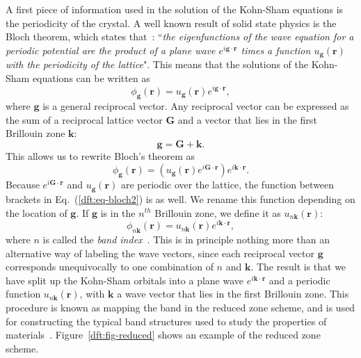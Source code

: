 \begin{refsection}
A first piece of information used in the solution of the Kohn-Sham equations 
is the periodicity of the crystal. A well known result of solid state physics 
is the Bloch theorem, which states that~\cite{Kittel2004}: ``\textit{the 
eigenfunctions of the wave equation for a periodic potential are the product 
of a plane wave $e^{i\mathbf{g}\cdot \mathbf{r}}$ times a function 
$u_{\mathbf{g}}(\mathbf{r})$ with the periodicity of the lattice}". This means 
that the solutions of the Kohn-Sham equations can be written as 
\begin{equation} 
\phi_{\mathbf{g}}(\mathbf{r}) = u_{\mathbf{g}}(\mathbf{r}) e^{i\mathbf{g}\cdot 
\mathbf{r}}, 
\end{equation} 
where $\mathbf{g}$ is a general reciprocal vector. Any reciprocal vector can 
be expressed as the sum of a reciprocal lattice vector $\mathbf{G}$ and a 
vector that lies in the first Brillouin zone $\mathbf{k}$:  
\begin{equation} 
\mathbf{g} = \mathbf{G} + \mathbf{k}. 
\end{equation} 
This allows us to rewrite Bloch's theorem as 
\begin{equation}\label{dft:eq-bloch2} 
\phi_{\mathbf{g}}(\mathbf{r}) = \left( u_{\mathbf{g}}(\mathbf{r}) 
e^{i\mathbf{G}\cdot \mathbf{r}}\right)e^{i\mathbf{k}\cdot \mathbf{r}}. 
\end{equation} 
Because $e^{i\mathbf{G}\cdot\mathbf{r}}$ and $u_{\mathbf{g}}(\mathbf{r})$ are 
periodic over the lattice, the function between brackets in 
Eq.~(\ref{dft:eq-bloch2}) is as well. We rename this function depending on the 
location of $\mathbf{g}$. If $\mathbf{g}$ is in the $n^{th}$ Brillouin zone, 
we define it as $u_{n\mathbf{k}}(\mathbf{r})$: 
\begin{equation}\label{dft:eq-bloch} 
\phi_{n\mathbf{k}}(\mathbf{r}) = u_{n\mathbf{k}}(\mathbf{r}) 
e^{i\mathbf{k}\cdot \mathbf{r}}, 
\end{equation} 
where $n$ is called the \textit{band index}~\cite{Cottenier2013}. This is in 
principle nothing more than an alternative way of labeling the wave vectors, 
since each reciprocal vector $\mathbf{g}$ corresponds unequivocally to one 
combination of $n$ and $\mathbf{k}$. The result is that we have split up the 
Kohn-Sham orbitals into a plane wave $e^{i\mathbf{k}\cdot \mathbf{r}}$ and a 
periodic function $u_{n\mathbf{k}}(\mathbf{r})$, with $\mathbf{k}$ a wave 
vector that lies in the first Brillouin zone. This procedure is known as 
mapping the band in the reduced zone scheme, and is used for constructing the 
typical band structures used to study the properties of 
materials~\cite{Kittel2004}. Figure~\ref{dft:fig-reduced} shows an example of the 
reduced zone scheme. 
 

\end{refsection}
